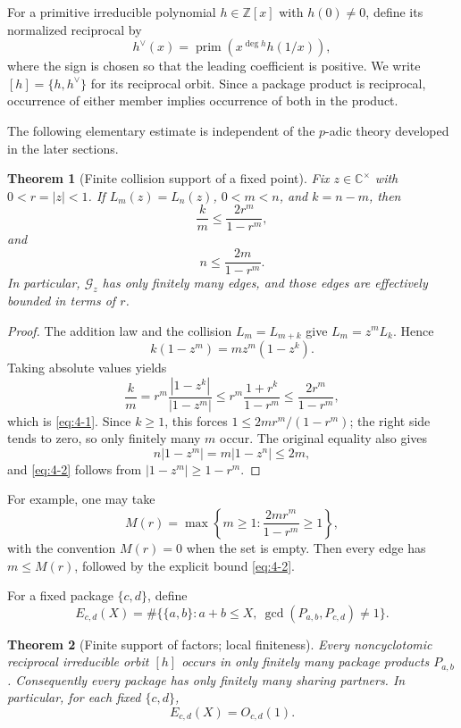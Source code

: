 \documentclass[11pt]{article}
\numberwithin{equation}{section}
\newtheorem{theorem}{Theorem}[section]
\theoremstyle{definition}
\newcommand{\Z}{\mathbb Z}
\newcommand{\C}{\mathbb C}
\begin{document}
For a primitive irreducible polynomial \(h\in\Z[x]\) with \(h(0)\neq0\),
define its normalized reciprocal by
\[
 h^\vee(x)=\operatorname{prim}\!\left(x^{\deg h}h(1/x)\right),
\]
where the sign is chosen so that the leading coefficient is positive.  We
write \([h]=\{h,h^\vee\}\) for its reciprocal orbit.  Since a package
product is reciprocal, occurrence of either member implies occurrence of both
in the product.

The following elementary estimate is independent of the \(p\)-adic theory
developed in the later sections.

\begin{theorem}[Finite collision support of a fixed point]
\label{thm:pointfinite}
Fix \(z\in\C^\times\) with \(0<r=|z|<1\).  If
\(L_m(z)=L_n(z)\), \(0<m<n\), and \(k=n-m\), then
\begin{equation}
 \frac{k}{m}
 \leq \frac{2r^m}{1-r^m},
 \label{eq:4-1}
\end{equation}
and
\begin{equation}
 n\leq\frac{2m}{1-r^m}.
 \label{eq:4-2}
\end{equation}
In particular, \(\mathcal G_z\) has only finitely many edges, and those edges
are effectively bounded in terms of \(r\).
\end{theorem}

\begin{proof}
The addition law and the collision \(L_m=L_{m+k}\) give
\(L_m=z^mL_k\).  Hence
\[
 k(1-z^m)=mz^m(1-z^k).
\]
Taking absolute values yields
\[
 \frac{k}{m}
 =r^m\frac{|1-z^k|}{|1-z^m|}
 \leq r^m\frac{1+r^k}{1-r^m}
 \leq\frac{2r^m}{1-r^m},
\]
which is \eqref{eq:4-1}.  Since \(k\geq1\), this forces
\(1\leq2mr^m/(1-r^m)\); the right side tends to zero, so only finitely
many \(m\) occur.  The original equality also gives
\[
 n|1-z^m|=m|1-z^n|\leq2m,
\]
and \eqref{eq:4-2} follows from \(|1-z^m|\geq1-r^m\).
\end{proof}

For example, one may take
\[
 M(r)=\max\left\{m\geq1:\frac{2mr^m}{1-r^m}\geq1\right\},
\]
with the convention \(M(r)=0\) when the set is empty.  Then every edge has
\(m\leq M(r)\), followed by the explicit bound \eqref{eq:4-2}.

For a fixed package \(\{c,d\}\), define
\[
 E_{c,d}(X)=\#\bigl\{\{a,b\}:a+b\leq X,
 \ \gcd(P_{a,b},P_{c,d})\neq1\bigr\}.
\]

\begin{theorem}[Finite support of factors; local finiteness]
\label{thm:localfinite}
Every noncyclotomic reciprocal irreducible orbit \([h]\) occurs in only
finitely many package products \(P_{a,b}\).  Consequently every package has
only finitely many sharing partners.  In particular, for each fixed
\(\{c,d\}\),
\[
 E_{c,d}(X)=O_{c,d}(1).
\]
\end{theorem}
\end{document}
